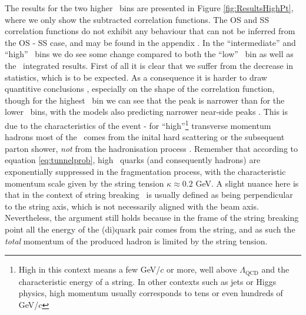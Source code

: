   The results for the two higher \pt\ bins are presented in Figure \ref{fig:ResultsHighPt}, where we only show the subtracted correlation functions. The OS and SS correlation functions do not exhibit any behaviour that can not be inferred from the OS - SS case, and may be found in the appendix . In the ``intermediate'' and ``high'' \pt\ bins we do see some change compared to both the ``low'' \pt\ bin as well as the \pt\ integrated results.  First of all it is clear that we suffer from the decrease in statistics, which is to be expected. As a consequence it is harder to draw quantitive conclusions , especially on the shape of the correlation function, though for the highest \pt\ bin we can see that the peak is narrower than for the lower \pt\ bins, with the models also predicting narrower near-side peaks . This is due to the characteristics of the event - for ``high''\footnote{High in this context means a few GeV/$c$ or more, well above $\Lambda_\text{QCD}$ and the characteristic energy of a string. In other contexts such as jets or Higgs physics, high momentum usually corresponds to tens or even hundreds of GeV/$c$} transverse momentum hadrons most of the \pt\ comes from the inital hard scattering or the subsequent parton shower, \textit{not} from the hadronisation process . Remember that according to equation \ref{eq:tunnelprob}, high \pt\ quarks (and consequently hadrons) are exponentially suppressed in the fragmentation process, with the characteristic momentum scale given by the string tension $\kappa \approx 0.2$ GeV. A slight nuance here is that in the context of string breaking \pt\ is usually defined as being perpendicular to the string axis, which is not necessarily aligned with the beam axis. Nevertheless, the argument still holds because in the frame of the string breaking point all the energy of the (di)quark pair comes from the string, and as such the \textit{total} momentum of the produced hadron is limited by the string tension. 
